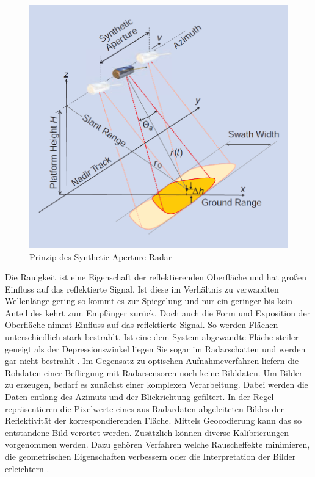 \begin{figure}[h]
    \centering
    \includegraphics[width=12cm]{Bilder/SAR_Prinzip.png}
    \caption{Prinzip des Synthetic Aperture Radar \cite{tutorial_on_sar}}
    \label{fig:sar_prinzip}
\end{figure}

Die Rauigkeit ist eine Eigenschaft der reflektierenden Oberfläche und hat großen Einfluss auf das reflektierte Signal. Ist diese im Verhältnis zu verwandten
Wellenlänge gering so kommt es zur Spiegelung und nur ein geringer bis kein Anteil des kehrt zum Empfänger zurück. Doch auch die Form und Exposition der Oberfläche nimmt 
Einfluss auf das reflektierte Signal. So werden Flächen unterschiedlich stark bestrahlt. Ist eine dem System abgewandte Fläche steiler geneigt als der Depressionswinkel 
liegen Sie sogar im Radarschatten und werden gar nicht bestrahlt \cite{einfuehrung_in_fernerkundung}. Im Gegensatz zu optischen Aufnahmeverfahren liefern die Rohdaten 
einer Befliegung mit Radarsensoren noch keine Bilddaten. Um Bilder zu erzeugen, bedarf es zunächst einer komplexen Verarbeitung. Dabei werden die Daten entlang des Azimuts und der Blickrichtung gefiltert. 
In der Regel repräsentieren die Pixelwerte eines aus Radardaten abgeleiteten Bildes der Reflektivität der korrespondierenden Fläche. 
Mittels Geocodierung kann das so entstandene Bild verortet werden. Zusätzlich können diverse Kalibrierungen vorgenommen werden. Dazu gehören Verfahren welche Rauscheffekte 
minimieren, die geometrischen Eigenschaften verbessern oder die Interpretation der Bilder erleichtern \cite{tutorial_on_sar}. 

